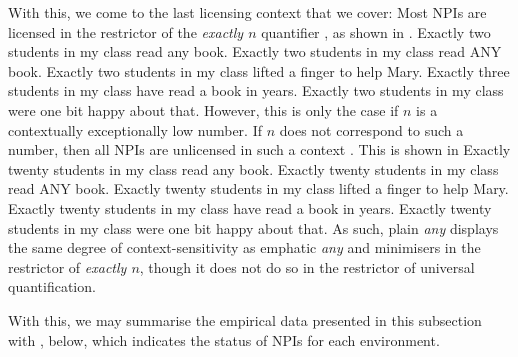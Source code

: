 With this, we come to the last licensing context that we cover: Most NPIs are licensed in the restrictor of the \textit{exactly $n$} quantifier \textcite{Linebarger1980,Linebarger1987}, as shown in .
\pex[nopreamble=true]\label{ex:npi-nm-okay}%
\a{} Exactly two students in my class read any book.
\a{} Exactly two students in my class read \MakeUppercase{any} book.
\a{} Exactly two students in my class lifted a finger to help Mary.
\a{}\ljudge{\#} Exactly three students in my class have read a book in years.
\a{}\ljudge{\#} Exactly two students in my class were one bit happy about that.
\xe
However, this is only the case if $n$ is a contextually exceptionally low number. If $n$ does not correspond to such a number, then all NPIs are unlicensed in such a context \parencite{Crnic2011,Crnic2014-dogma,Crnic2014-nm}. This is shown in 
\pex[nopreamble=true]\label{ex:npi-nm-bad}%
\a{}\ljudge{\#} Exactly twenty students in my class read any book.
\a{}\ljudge{\#} Exactly twenty students in my class read \MakeUppercase{any} book.
\a{}\ljudge{\#} Exactly twenty students in my class lifted a finger to help Mary.
\a{}\ljudge{\#} Exactly twenty students in my class have read a book in years.
\a{}\ljudge{\#} Exactly twenty students in my class were one bit happy about that.
\xe
As such, plain \textit{any} displays the same degree of context-sensitivity as emphatic \textit{any} and minimisers in the restrictor of \textit{exactly $n$}, though it does not do so in the restrictor of universal quantification.

With this, we may summarise the empirical data presented in this subsection with , below, which indicates the status of NPIs for each environment.
\begin{table}[!htb]
\end{table}

